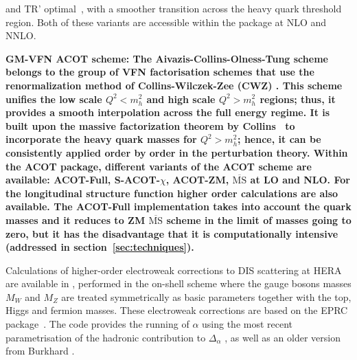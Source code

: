 \begin{description}
and TR' optimal~\cite{Thorne:6180}, with a smoother transition across the heavy quark threshold region. 
Both of these variants are accessible within the \fitter  package at NLO and NNLO.
\vspace{0.1cm}
\item \bf {GM-VFN ACOT scheme:} \rm
The Aivazis-Collins-Olness-Tung scheme belongs to the group of VFN factorisation 
schemes that use the renormalization method of Collins-Wilczek-Zee (CWZ) \cite{CWZ}.
This scheme unifies the low scale $Q^2 < m_h^2$ and high scale $Q^2 > m_h^2$ regions; 
thus, it provides a smooth interpolation across the full energy regime. 
It is built upon the massive factorization theorem by Collins~\cite{CWZ} 
to incorporate the heavy quark masses for $Q^2 > m_h^2$; hence, it can be consistently applied 
order by order in the perturbation theory.
%
Within the ACOT package, different variants of the ACOT scheme are available:
ACOT-Full, S-ACOT-$\chi$, ACOT-ZM, $\overline{\text{MS}}$ at LO and NLO. 
For the longitudinal structure function higher order calculations are also available. 
The ACOT-Full implementation takes into account the quark masses 
and it reduces to ZM $\overline{\text{MS}}$ scheme in the limit of masses going to zero, 
but it has the disadvantage that it is computationally intensive (addressed in 
section~\ref{sec:techniques}).

\vspace{0.1cm}
\end{description}

Calculations of higher-order electroweak corrections to DIS scattering at 
HERA are available in \fitter, performed in the on-shell scheme 
where the gauge bosons masses $M_W$ and 
$M_Z$ are treated symmetrically as basic parameters together with the top, 
Higgs and fermion masses.
These electroweak corrections 
are based on the EPRC package~\cite{SpiesbergerPrivComm}.
The code provides the running of $\alpha$ using the most recent parametrisation
of the hadronic contribution to $\Delta_\alpha$ \cite{Jegerlehner}, as well as 
an older version from Burkhard \cite{Burkhard}.



